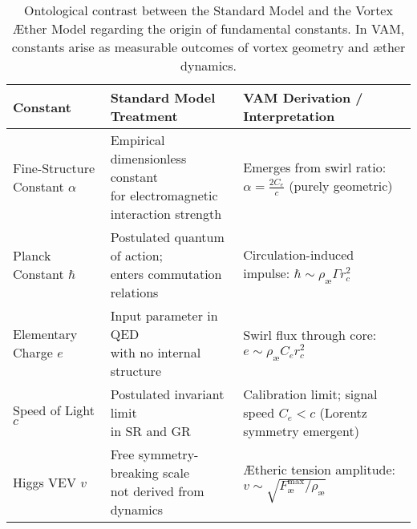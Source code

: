 \begin{table}[H]
    \centering
    \footnotesize
    \renewcommand{\arraystretch}{1.3}
    \begin{tabular}{|l|l|l|}
        \hline
        \textbf{Constant} & \textbf{Standard Model Treatment} & \textbf{VAM Derivation / Interpretation} \\
        \hline

        \makecell[l]{Fine-Structure \\ Constant $\alpha$} &
        \makecell[l]{Empirical dimensionless constant \\ for electromagnetic interaction strength} &
        \makecell[l]{Emerges from swirl ratio: \\ $\alpha = \frac{2 C_e}{c}$ \\ (purely geometric)} \\
        \hline

        \makecell[l]{Planck Constant \\ $\hbar$} &
        \makecell[l]{Postulated quantum of action; \\ enters commutation relations} &
        \makecell[l]{Circulation-induced impulse: \\ $\hbar \sim \rho_\text{\ae} \Gamma r_c^2$} \\
        \hline

        \makecell[l]{Elementary \\ Charge $e$} &
        \makecell[l]{Input parameter in QED \\ with no internal structure} &
        \makecell[l]{Swirl flux through core: \\ $e \sim \rho_\text{\ae} C_e r_c^2$} \\
        \hline

        \makecell[l]{Speed of \\ Light $c$} &
        \makecell[l]{Postulated invariant limit \\ in SR and GR} &
        \makecell[l]{Calibration limit; \\ signal speed $C_e < c$ \\ (Lorentz symmetry emergent)} \\
        \hline

        \makecell[l]{Higgs VEV \\ $v$} &
        \makecell[l]{Free symmetry-breaking scale \\ not derived from dynamics} &
        \makecell[l]{Ætheric tension amplitude: \\ $v \sim \sqrt{F^{\text{max}}_{\text{\ae}} / \rho_\text{\ae}}$} \\
        \hline

    \end{tabular}
    \caption{Ontological contrast between the Standard Model and the Vortex Æther Model regarding the origin of fundamental constants. In VAM, constants arise as measurable outcomes of vortex geometry and æther dynamics.}
    \label{tab:SM_vs_VAM_constants}
\end{table}

